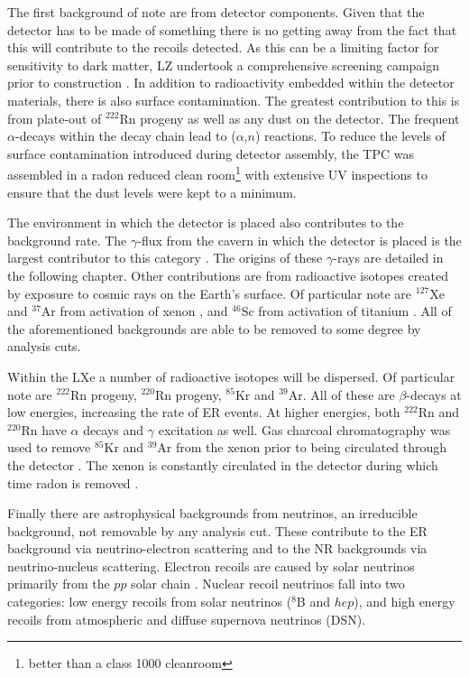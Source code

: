 \par
The first background of note are from detector components.
Given that the detector has to be made of something there is no getting away from the fact that this will contribute to the recoils detected.
As this can be a limiting factor for sensitivity to dark matter, LZ undertook a comprehensive screening campaign prior to construction \cite{LZ_assay_ref}.
In addition to radioactivity embedded within the detector materials, there is also surface contamination.
The greatest contribution to this is from plate-out of ${}^{222}$Rn progeny as well as any dust on the detector.
The frequent $\alpha$-decays within the decay chain lead to ($\alpha$,$n$) reactions.
To reduce the levels of surface contamination introduced during detector assembly, the TPC was assembled in a radon reduced clean room\footnote{better than a class 1000 cleanroom} with extensive UV inspections to ensure that the dust levels were kept to a minimum.

\par
The environment in which the detector is placed also contributes to the background rate.
The $\gamma$-flux from the cavern in which the detector is placed is the largest contributor to this category \cite{LZ_Gamma_Ray_Background_ref}.
The origins of these $\gamma$-rays are detailed in the following chapter.
Other contributions are from radioactive isotopes created by exposure to cosmic rays on the Earth's surface.
Of particular note are $^{127}$Xe and ${}^{37}$Ar from activation of xenon \cite{lux_xenon_activation_ref,lz_argon37_ref}, and $^{46}$Sc from activation of titanium \cite{LZ_TechnicalDesignReview_ref}.
All of the aforementioned backgrounds are able to be removed to some degree by analysis cuts.

\par
Within the LXe a number of radioactive isotopes will be dispersed.
Of particular note are $^{222}$Rn progeny, $^{220}$Rn progeny, $^{85}$Kr and $^{39}$Ar.
All of these are $\beta$-decays at low energies, increasing the rate of ER events.
At higher energies, both $^{222}$Rn and $^{220}$Rn have $\alpha$ decays and $\gamma$ excitation as well.
Gas charcoal chromatography was used to remove $^{85}$Kr and $^{39}$Ar from the xenon prior to being circulated through the detector \cite{xenon_prufication_chromatography_ref}.
The xenon is constantly circulated in the detector during which time radon is removed \cite{marisarthurs_thesis_ref}.

\par
Finally there are astrophysical backgrounds from neutrinos, an irreducible background, not removable by any analysis cut.
These contribute to the ER background via neutrino-electron scattering and to the NR backgrounds via neutrino-nucleus scattering.
Electron recoils are caused by solar neutrinos primarily from the $pp$ solar chain \cite{solar_neutrinos_ref}.
Nuclear recoil neutrinos fall into two categories: low energy recoils from solar neutrinos ($^{8}$B and $hep$), and high energy recoils from atmospheric and diffuse supernova neutrinos (DSN).

